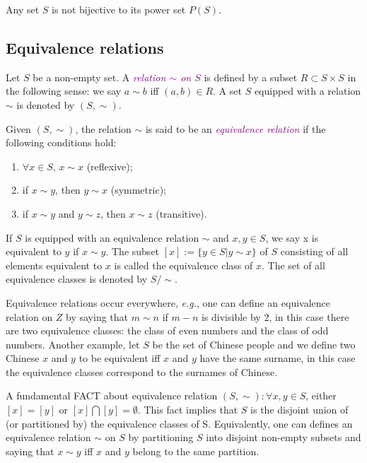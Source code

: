 \begin{lemma}
    Any set $S$ is not bijective to its power set $P(S)$.
\end{lemma}

\subsection{Equivalence relations}
\begin{definition}
    Let $S$ be a non-empty set. A \textcolor{purple}{\textit{relation $\sim$ on $S$}} is defined by a subset $R \subset  S \times  S$ in
the following sense: we say $a \sim b$ iff $(a, b) \in R$. A set $S$ equipped with a relation $\sim$ is
denoted by $(S, \sim)$.
\end{definition}

\begin{definition}
Given $(S, \sim)$, the relation $\sim$ is said to be an \textcolor{purple}{\textit{equivalence relation}} if the following conditions
hold:
\begin{enumerate}
    \item $\forall x \in S$, $x \sim x$ (reflexive);
    \item if $x \sim y$, then $y \sim x$ (symmetric);
    \item if $x \sim y$ and $y \sim z$, then $x \sim z$ (transitive).
\end{enumerate}

\end{definition}




If $S$ is equipped with an equivalence relation $\sim$ and $x, y \in S$, we say x is equivalent to
$y$ if $x \sim y$. The subset $[x] := \{y \in S| y \sim x\}$ of $S$ consisting of all elements equivalent
to $x$ is called the equivalence class of $x$. The set of all equivalence classes is denoted by
$S/ \sim$.

Equivalence relations occur everywhere, \textit{e.g.}, one can define an equivalence relation on
$Z$ by saying that $m \sim n$ if $m - n$ is divisible by $2$, in this case there are two equivalence
classes: the class of even numbers and the class of odd numbers. Another example, let
$S$ be the set of Chinese people and we define two Chinese $x$ and $y$ to be equivalent iff
$x$ and $y$ have the same surname, in this case the equivalence classes correspond to the
surnames of Chinese.

\begin{lemma}
A fundamental FACT about equivalence relation $(S, \sim): \forall x, y \in S$, either $[x] = [y]$ or
$[x] \bigcap [y] = \emptyset$. This fact implies that $S$ is the disjoint union of (or partitioned by) the
equivalence classes of S. Equivalently, one can defines an equivalence relation $\sim$ on $S$ by
partitioning $S$ into disjoint non-empty subsets and saying that $ x \sim y$ iff $x$ and $y$ belong
to the same partition.
\end{lemma}

